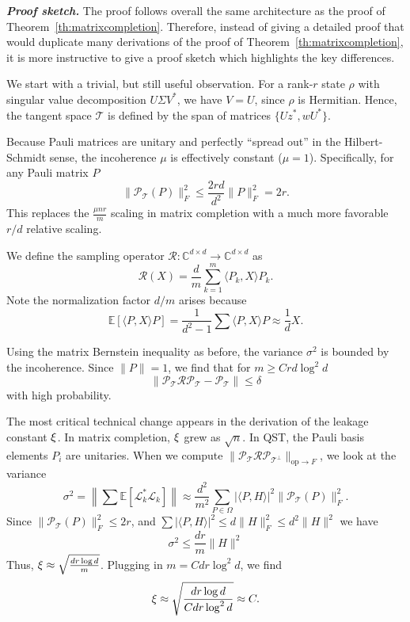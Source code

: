 \medskip
\noindent
\textbf{\em Proof sketch.}
The proof follows overall the same architecture as the proof of Theorem~\ref{th:matrixcompletion}. Therefore, instead of giving a detailed proof that would duplicate many derivations of the proof of Theorem~\ref{th:matrixcompletion}, it is more instructive to give a proof sketch which highlights the key differences.

We start with a trivial, but still useful observation.
For a rank-$r$ state $\rho$ with singular value decomposition $U \Sigma V^*$, we have $V=U$, since $\rho$ is Hermitian. Hence, the tangent space $\mathcal{T}$ is defined by the span of matrices $\{Uz^*, wU^*\}$.

Because Pauli matrices are unitary and perfectly ``spread out'' in the Hilbert-Schmidt sense, the incoherence $\mu$ is effectively constant ($\mu = 1$). Specifically, for any Pauli matrix $P$
$$\|\mathcal{P}_{\mathcal{T}}(P)\|_F^2 \le \frac{2rd}{d^2}  \|P\|_F^2 = 2r.$$
This replaces the $\frac{\mu nr}{m}$ scaling in matrix completion with a much more favorable $r/d$ relative scaling.


We define the sampling operator $\mathcal{R}: \mathbb{C}^{d \times d} \to \mathbb{C}^{d \times d}$ as
$$\mathcal{R}(X) = \frac{d}{m} \sum_{k=1}^m \langle P_k, X \rangle P_k.$$
Note the normalization factor $d/m$ arises because 
$$\mathbb{E}[\langle P, X \rangle P] = \frac{1}{d^2-1} \sum \langle P, X \rangle P \approx \frac{1}{d} X.$$

Using the matrix Bernstein inequality as before, the variance $\sigma^2$ is bounded by the incoherence. Since $\|P\|=1$, we find that for $m \ge C r d \log^2 d$
$$\|\mathcal{P}_{\mathcal{T}} \mathcal{R} \mathcal{P}_{\mathcal{T}} - \mathcal{P}_{\mathcal{T}}\| \le \delta$$
with high probability.

The most critical technical change appears in the derivation of the leakage constant $\xi$. In matrix completion, $\xi$ grew as $\sqrt{n}$.
In QST, the Pauli basis elements $P_i$ are unitaries.
When we compute $\|\mathcal{P}_{\mathcal{T}} \mathcal{R} \mathcal{P}_{\mathcal{T}^\perp}\|_{\text{op} \to F}$, we look at the variance
$$\sigma^2 = \left\| \sum \mathbb{E} [ \mathcal{L}_k^* \mathcal{L}_k ] \right\| \approx \frac{d^2}{m^2} \sum_{P \in \Omega} |\langle P, H \rangle|^2  \|\mathcal{P}_{\mathcal{T}}(P)\|_F^2.$$
Since $\|\mathcal{P}_{\mathcal{T}}(P)\|_F^2 \le 2r$, and $\sum |\langle P, H \rangle|^2 \le d \|H\|_F^2 \le d^2 \|H\|^2$ we have
$$\sigma^2 \le \frac{dr}{m}  \|H\|^2$$
Thus, $\xi \approx \sqrt{\frac{d r \log d}{m}}$. Plugging in $m = C d r \log^2 d$, we find
$$\xi \approx \sqrt{\frac{dr \log d}{C dr \log^2 d}} \approx C.$$


